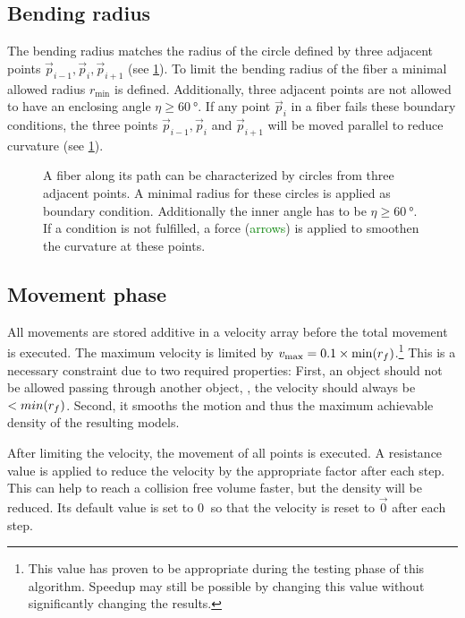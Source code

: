 \subsection{Bending radius}
%
The bending radius matches the radius of the circle defined by three adjacent points $\vec{p}_{i-1}, \vec{p}_{i}, \vec{p}_{i+1}$ (see \cref{fig:modelCircle}).
To limit the bending radius of the fiber a minimal allowed radius $r_{\min}$ is defined.
Additionally, three adjacent points are not allowed to have an enclosing angle $\eta \geq \SI{60}{\degree}$.
If any point $\vec{p}_{i}$ in a fiber fails these boundary conditions, the three points $\vec{p}_{i-1}, \vec{p}_{i}$ and $\vec{p}_{i+1}$ will be moved parallel to reduce curvature (see \cref{fig:modelCircle}).
%
\begin{figure}[!t]
    \centering
    \setlength{\tikzheight}{.75\textwidth}
	\caption[]{A fiber along its path can be characterized by circles from three adjacent points.
    A minimal radius for these circles is applied as boundary condition.
    Additionally the inner angle has to be $\eta \geq \SI{60}{\degree}$.
    If a condition is not fulfilled, a force (\textcolor{GREEN}{arrows}) is applied to smoothen the curvature at these points.}
	\label{fig:modelCircle}
\end{figure}
%
%
%
\subsection{Movement phase}
%
All movements are stored additive in a velocity array before the total movement is executed.
The maximum velocity is limited by $v_{\max} = 0.1 \times \min(\mathit{\textnormal{$r_f$}})$.\footnote{This value has proven to be appropriate during the testing phase of this algorithm. Speedup may still be possible by changing this value without significantly changing the results.}
This is a necessary constraint due to two required properties:
First, an object should not be allowed passing through another object, \ie{}, the velocity should always be $<min(\textnormal{$r_f$})$.
Second, it smooths the motion and thus the maximum achievable density of the resulting models.
\par
%
After limiting the velocity, the movement of all points is executed.
A resistance value is applied to reduce the velocity by the appropriate factor after each step.
This can help to reach a collision free volume faster, but the density will be reduced.
Its default value is set to $\SI{0}{}$ so that the velocity is reset to $\vec{0}$ after each step.
%
%
%
